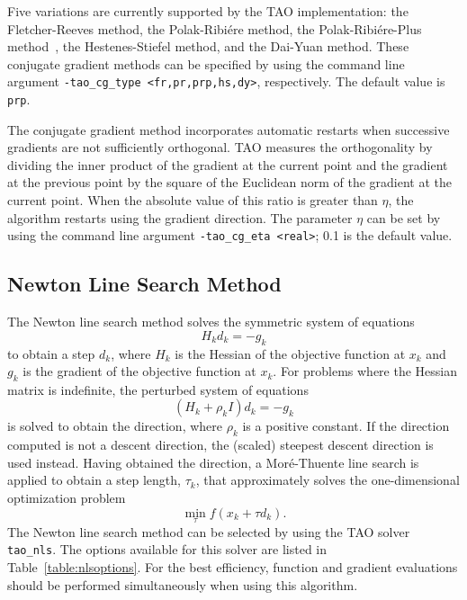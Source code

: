 Five variations are currently supported by the TAO implementation: the 
Fletcher-Reeves method, the Polak-Ribi\'ere method, the Polak-Ribi\'ere-Plus 
method~\cite{NW99}, the Hestenes-Stiefel method, and the Dai-Yuan method.  
These conjugate gradient methods can be specified by using the command line 
argument {\tt -tao\_cg\_type <fr,pr,prp,hs,dy>}, respectively.  The default 
value is {\tt prp}.  

The conjugate gradient method incorporates automatic restarts when successive 
gradients are not sufficiently orthogonal.  TAO measures the orthogonality by 
dividing the inner product of the gradient at the current point and the 
gradient at the previous point by the square of the Euclidean norm of 
the gradient at the current point.  When the absolute value of this 
ratio is greater than $\eta$, the algorithm restarts using the gradient 
direction.  The parameter $\eta$ can be set by using the command line argument 
{\tt -tao\_cg\_eta <real>}; 0.1 is the default value.  

\subsection{Newton Line Search Method}

The Newton line search method solves the symmetric system of equations
\[
H_k d_k = -g_k
\]
to obtain a step $d_k$, where $H_k$ is the Hessian of the objective function
at $x_k$ and $g_k$ is the gradient of the objective function at $x_k$.
For problems where the Hessian matrix is indefinite, the perturbed system
of equations
\[
(H_k + \rho_k I) d_k = -g_k
\]
is solved to obtain the direction, where $\rho_k$ is a positive constant.
If the direction computed is not a descent direction, the (scaled) steepest 
descent direction is used instead.  Having obtained the direction, 
a Mor\'{e}-Thuente line search is applied to obtain a step length, 
$\tau_k$, that approximately solves the one-dimensional optimization 
problem
\[
\min_\tau f(x_k + \tau d_k).
\]
The Newton line search method can be selected by using the TAO 
solver {\tt tao\_nls}.
The options available for this solver are listed in
Table~\ref{table:nlsoptions}.
For the best efficiency, function and gradient evaluations should be 
performed simultaneously when using this algorithm.

